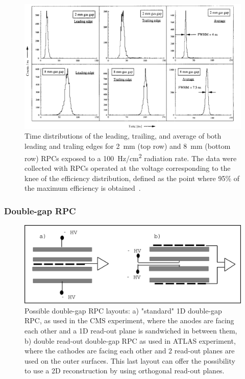 	\begin{figure}[H]
		\centering
		\includegraphics[width = \linewidth]{fig/chapt3/Time-res-gap-width.png}
		\caption{\label{fig:GapWidthTime} Time distributions of the leading, trailing, and average of both leading and traling edges for \SI{2}{mm} (top row) and \SI{8}{mm} (bottom row) RPCs exposed to a \SI{100}{Hz/cm^2} radiation rate. The data were collected with RPCs operated at the voltage corresponding to the knee of the efficiency distribution, defined as the point where 95\% of the maximum efficiency is obtained~\cite{ZEBALLOS96COMP}.}
	\end{figure}
	
		\subsubsection{Double-gap RPC}
		\label{chapt3:sssec:DGRPC}
	
	\begin{figure}[H]
		\centering
		\includegraphics[width = \plotwidth]{fig/chapt3/Double_gap_layouts.pdf}
		\caption{\label{fig:DGLayout} Possible double-gap RPC layouts: a) "standard" 1D double-gap RPC, as used in the CMS experiment, where the anodes are facing each other and a 1D read-out plane is sandwiched in between them,  b) double read-out double-gap RPC as used in ATLAS experiment, where the cathodes are facing each other and 2 read-out planes are used on the outer surfaces. This last layout can offer the possibility to use a 2D reconstruction by using orthogonal read-out planes.}
	\end{figure}
	
